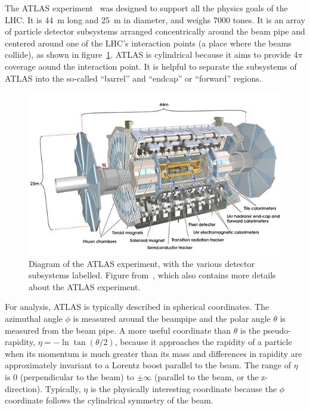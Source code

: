 The ATLAS experiment~\cite{collaboration_atlas_2008} was designed to support all the physics goals of the LHC. It is \SI{44}{\meter} long and \SI{25}{\meter} in diameter, and weighs 7000 tones. It is an array of particle detector subsystems arranged concentrically around the beam pipe and centered around one of the LHC's interaction points (a place where the beams collide), as shown in figure~\ref{fig:atlas}. ATLAS is cylindrical because it aims to provide 4$\pi$ coverage aound the interaction point. It is helpful to separate the subsystems of ATLAS into the so-called ``barrel'' and ``endcap'' or ``forward'' regions.  %

\begin{figure}
    \centering
    \includegraphics[width = \textwidth]{figures/atlas_diagram.png}
    \caption{Diagram of the ATLAS experiment, with the various detector subsystems labelled. Figure from~\cite{collaboration_atlas_2008}, which also contains more details about the ATLAS experiment.}
    \label{fig:atlas}
\end{figure}

For analysis, ATLAS is typically described in spherical coordinates. The azimuthal angle $\phi$ is measured around the beampipe and the polar angle $\theta$ is measured from the beam pipe. A more useful coordinate than $\theta$ is the pseudo-rapidity, $\eta = -\ln\tan\left(\theta/2\right)$, because it approaches the rapidity of a particle when its momentum is much greater than its mass and differences in rapidity are approximately invariant to a Lorentz boost parallel to the beam. The range of $\eta$ is 0 (perpendicular to the beam) to $\pm\infty$ (parallel to the beam, or the z-direction). Typically, $\eta$ is the physically interesting coordinate because the $\phi$ coordinate follows the cylindrical symmetry of the beam.

